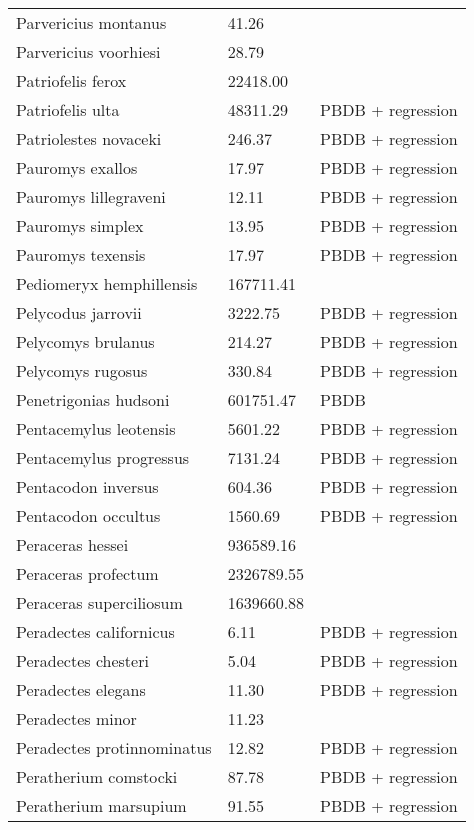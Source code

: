 \begin{center}
\begin{longtable}{p{} p{} p{} }
  Parvericius montanus & 41.26 & \cite{Tomiya2013} \\ 
  Parvericius voorhiesi & 28.79 & \cite{Tomiya2013} \\ 
  Patriofelis ferox & 22418.00 & \cite{McKenna2011} \\ 
  Patriofelis ulta & 48311.29 & PBDB + regression \\ 
  Patriolestes novaceki & 246.37 & PBDB + regression \\ 
  Pauromys exallos & 17.97 & PBDB + regression \\ 
  Pauromys lillegraveni & 12.11 & PBDB + regression \\ 
  Pauromys simplex & 13.95 & PBDB + regression \\ 
  Pauromys texensis & 17.97 & PBDB + regression \\ 
  Pediomeryx hemphillensis & 167711.41 & \cite{Tomiya2013} \\ 
  Pelycodus jarrovii & 3222.75 & PBDB + regression \\ 
  Pelycomys brulanus & 214.27 & PBDB + regression \\ 
  Pelycomys rugosus & 330.84 & PBDB + regression \\ 
  Penetrigonias hudsoni & 601751.47 & PBDB \\ 
  Pentacemylus leotensis & 5601.22 & PBDB + regression \\ 
  Pentacemylus progressus & 7131.24 & PBDB + regression \\ 
  Pentacodon inversus & 604.36 & PBDB + regression \\ 
  Pentacodon occultus & 1560.69 & PBDB + regression \\ 
  Peraceras hessei & 936589.16 & \cite{Tomiya2013} \\ 
  Peraceras profectum & 2326789.55 & \cite{Tomiya2013} \\ 
  Peraceras superciliosum & 1639660.88 & \cite{Tomiya2013} \\ 
  Peradectes californicus & 6.11 & PBDB + regression \\ 
  Peradectes chesteri & 5.04 & PBDB + regression \\ 
  Peradectes elegans & 11.30 & PBDB + regression \\ 
  Peradectes minor & 11.23 & \cite{Taylor1976} \\ 
  Peradectes protinnominatus & 12.82 & PBDB + regression \\ 
  Peratherium comstocki & 87.78 & PBDB + regression \\ 
  Peratherium marsupium & 91.55 & PBDB + regression \\ 

\end{longtable}
\end{center}

